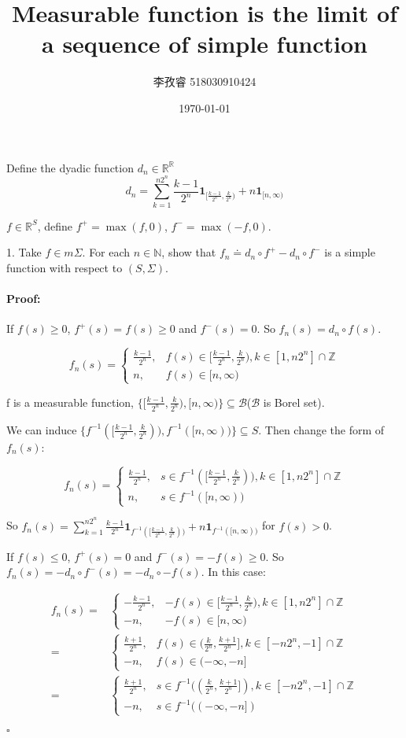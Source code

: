 \documentclass{article}
\title{Measurable function is the limit of a sequence of simple function}
\author{李孜睿 518030910424}
\date{\today}
\newenvironment{myproof}{\ignorespaces\paragraph{Proof:}}{\hfill $\square$\par\noindent}
\begin{document}
	\maketitle
	Define the dyadic function $d_n\in \mathbb{R}^{\mathbb{R}}$
	$$d_n=\sum_{k=1}^{n2^n}\frac{k-1}{2^n}\boldsymbol{1}_{[\frac{k-1}{2^n}, \frac{k}{2^n})}+n\boldsymbol{1}_{[n,\infty)}$$
	
	$f\in \mathbb{R}^S$, define $f^+=\max(f, 0)$, $f^-=\max(-f, 0)$.
	
	1. Take $f\in m\Sigma$. For each $n\in \mathbb{N}$, show that $f_n\doteq d_n\circ f^+ - d_n\circ f^-$ is a simple function with respect to $(S, \Sigma)$.
	\begin{myproof}
		If $f(s)\geq0$, $f^+(s)=f(s)\geq0$ and $f^-(s)=0$. So $f_n(s)=d_n\circ f(s)$.
				
		$$f_n(s)=\left\{
		\begin{array}{lr}
		\frac{k-1}{2^n},&f(s)\in [\frac{k-1}{2^n}, \frac{k}{2^n}), k\in[1, n2^n]\cap\mathbb{Z}\\
		n,&f(s)\in [n,\infty)
		\end{array}\right.
		$$
		
		f is a measurable function, $\{[\frac{k-1}{2^n}, \frac{k}{2^n}), [n,\infty)\}\subseteq\mathcal{B}$($\mathcal{B}$ is Borel set).
		
		We can induce $\{f^{-1}([\frac{k-1}{2^n}, \frac{k}{2^n})), f^{-1}([n,\infty))\}\subseteq S$. Then change the form of $f_n(s)$:
		
		
		$$f_n(s)=\left\{
		\begin{array}{lr}
		\frac{k-1}{2^n},&s\in f^{-1}([\frac{k-1}{2^n}, \frac{k}{2^n})), k\in[1, n2^n]\cap\mathbb{Z}\\
		n,&s\in f^{-1}([n,\infty))
		\end{array}\right.
		$$
		
		So $f_n(s)=\sum_{k=1}^{n2^n}\frac{k-1}{2^n}\boldsymbol{1}_{f^{-1}([\frac{k-1}{2^n}, \frac{k}{2^n}))}+n\boldsymbol{1}_{f^{-1}([n,\infty))}$ for $f(s)>0$.

		If $f(s)\leq0$, $f^+(s)=0$ and $f^-(s)=-f(s)\geq0$. So $f_n(s)=-d_n\circ f^-(s)=-d_n\circ -f(s)$. In this case:
		
		$$
		\begin{aligned}
		f_n(s)=&\left\{
		\begin{array}{lr}
		-\frac{k-1}{2^n},&-f(s)\in [\frac{k-1}{2^n}, \frac{k}{2^n}), k\in[1, n2^n]\cap\mathbb{Z}\\
		-n,&-f(s)\in [n,\infty)
		\end{array}\right.\\
		=&\left\{
		\begin{array}{lr}
		\frac{k+1}{2^n},&f(s)\in (\frac{k}{2^n}, \frac{k+1}{2^n}], k\in[-n2^n, -1]\cap\mathbb{Z}\\
		-n,&f(s)\in (-\infty,-n]
		\end{array}\right.\\
		=&\left\{
		\begin{array}{lr}
		\frac{k+1}{2^n},&s\in f^{-1}((\frac{k}{2^n}, \frac{k+1}{2^n}]), k\in[-n2^n, -1]\cap\mathbb{Z}\\
		-n,&s\in f^{-1}((-\infty,-n])
		\end{array}\right.
		\end{aligned}
		$$
		

\end{myproof}
\end{document}
